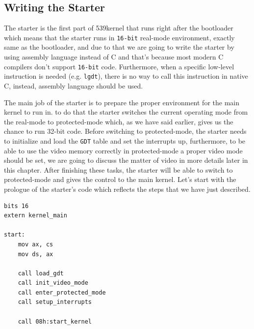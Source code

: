 \subsection{Writing the Starter}\label{writing-the-starter}

The starter is the first part of 539kernel that runs right after the
bootloader which means that the starter runs in \lstinline!16-bit!
real-mode environment, exactly same as the bootloader, and due to that
we are going to write the starter by using assembly language instead of
C and that's because most modern C compilers don't support
\lstinline!16-bit! code. Furthermore, when a specific low-level
instruction is needed (e.g. \lstinline!lgdt!), there is no way to call
this instruction in native C, instead, assembly language should be used.

The main job of the starter is to prepare the proper environment for the
main kernel to run in. to do that the starter switches the current
operating mode from the real-mode to protected-mode which, as we have
said earlier, gives us the chance to run 32-bit code. Before switching
to protected-mode, the starter needs to initialize and load the
\lstinline!GDT! table and set the interrupts up, furthermore, to be able
to use the video memory correctly in protected-mode a proper video mode
should be set, we are going to discuss the matter of video in more
details later in this chapter. After finishing these tasks, the starter
will be able to switch to protected-mode and gives the control to the
main kernel. Let's start with the prologue of the starter's code which
reflects the steps that we have just described.

\begin{lstlisting}
bits 16
extern kernel_main

start:
    mov ax, cs
    mov ds, ax
        
    call load_gdt
    call init_video_mode
    call enter_protected_mode
    call setup_interrupts
    
    call 08h:start_kernel
\end{lstlisting}

